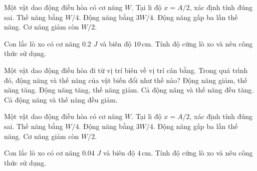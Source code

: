 \begin{ex}
Một vật dao động điều hòa có cơ năng $W$. Tại li độ $x=A/2$, xác định tính đúng sai.
\choiceTF
{\True Thế năng bằng $W/4$.}
{\True Động năng bằng $3W/4$.}
{\True Động năng gấp ba lần thế năng.}
{Cơ năng giảm còn $W/2$.}
\end{ex}

\begin{ex}
Con lắc lò xo có cơ năng 0.2 $J$ và biên độ $10\,\text{cm}$. Tính độ cứng lò xo và nêu công thức sử dụng.
\choiceTF

\end{ex}


\begin{ex}
Một vật dao động điều hòa đi từ vị trí biên về vị trí cân bằng. Trong quá trình đó, động năng và thế năng của vật biến đổi như thế nào?
\choice
{Động năng giảm, thế năng tăng.}
{\True Động năng tăng, thế năng giảm.}
{Cả động năng và thế năng đều tăng.}
{Cả động năng và thế năng đều giảm.}
\end{ex}

\begin{ex}
Một vật dao động điều hòa có cơ năng $W$. Tại li độ $x=A/2$, xác định tính đúng sai.
\choiceTF
{\True Thế năng bằng $W/4$.}
{\True Động năng bằng $3W/4$.}
{\True Động năng gấp ba lần thế năng.}
{Cơ năng giảm còn $W/2$.}
\end{ex}

\begin{ex}
Con lắc lò xo có cơ năng 0.04 $J$ và biên độ $4\,\text{cm}$. Tính độ cứng lò xo và nêu công thức sử dụng.
\choiceTF

\end{ex}

